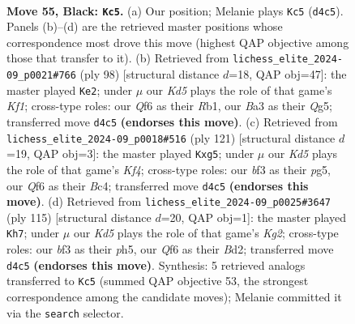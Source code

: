 \documentclass[11pt]{article}
\begin{document}
\clearpage

\begin{figure}[p]\centering
\begin{subfigure}{0.46\textwidth}\centering
\resizebox{\linewidth}{!}{%
\newchessgame
\chessboard[
  setfen={8/3R4/5q2/8/1p1k4/b4BK1/8/8 b - - 1 55},
  showmover=false,
  pgfstyle=straightmove, color=movearrow, markmove={d4-c5}
]}
\caption{}
\end{subfigure}\hfill
\begin{subfigure}{0.46\textwidth}\centering
\resizebox{\linewidth}{!}{%
\newchessgame
\chessboard[
  setfen={8/8/8/6Q1/4k2P/8/8/1R3K1r w - - 1 50},
  showmover=false,
  pgfstyle=straightmove, color=movearrow, markmove={f1-e2}
]}
\caption{}
\end{subfigure}
\\[4pt]
\begin{subfigure}{0.46\textwidth}\centering
\resizebox{\linewidth}{!}{%
\newchessgame
\chessboard[
  setfen={8/8/1R6/1p3kP1/2b5/4K3/8/8 b - - 0 61},
  showmover=false,
  pgfstyle=straightmove, color=movearrow, markmove={f5-g5}
]}
\caption{}
\end{subfigure}\hfill
\begin{subfigure}{0.46\textwidth}\centering
\resizebox{\linewidth}{!}{%
\newchessgame
\chessboard[
  setfen={8/6k1/2R5/7P/4K3/2p5/3b4/8 b - - 8 58},
  showmover=false,
  pgfstyle=straightmove, color=movearrow, markmove={g7-h7}
]}
\caption{}
\end{subfigure}
\caption{\textbf{Move 55, Black: \texttt{Kc5}.} (a) Our position; Melanie plays \texttt{Kc5} (\texttt{d4c5}). Panels (b)--(d) are the retrieved master positions whose correspondence most drove this move (highest QAP objective among those that transfer to it). (b) Retrieved from \texttt{lichess\_elite\_2024-09\_p0021\#766} (ply 98) [structural distance $d$=18, QAP obj=47]: the master played \texttt{Ke2}; under $\mu$ our \emph{Kd5} plays the role of that game's \emph{Kf1}; cross-type roles: our \emph{Q}f6 as their \emph{R}b1, our \emph{B}a3 as their \emph{Q}g5; transferred move \texttt{d4c5} \textbf{(endorses this move)}. (c) Retrieved from \texttt{lichess\_elite\_2024-09\_p0018\#516} (ply 121) [structural distance $d$=19, QAP obj=3]: the master played \texttt{Kxg5}; under $\mu$ our \emph{Kd5} plays the role of that game's \emph{Kf4}; cross-type roles: our \emph{b}f3 as their \emph{p}g5, our \emph{Q}f6 as their \emph{B}c4; transferred move \texttt{d4c5} \textbf{(endorses this move)}. (d) Retrieved from \texttt{lichess\_elite\_2024-09\_p0025\#3647} (ply 115) [structural distance $d$=20, QAP obj=1]: the master played \texttt{Kh7}; under $\mu$ our \emph{Kd5} plays the role of that game's \emph{Kg2}; cross-type roles: our \emph{b}f3 as their \emph{p}h5, our \emph{Q}f6 as their \emph{B}d2; transferred move \texttt{d4c5} \textbf{(endorses this move)}. Synthesis: 5 retrieved analogs transferred to \texttt{Kc5} (summed QAP objective 53, the strongest correspondence among the candidate moves); Melanie committed it via the \texttt{search} selector.}
\label{fig:thought-m109}
\end{figure}
\end{document}
